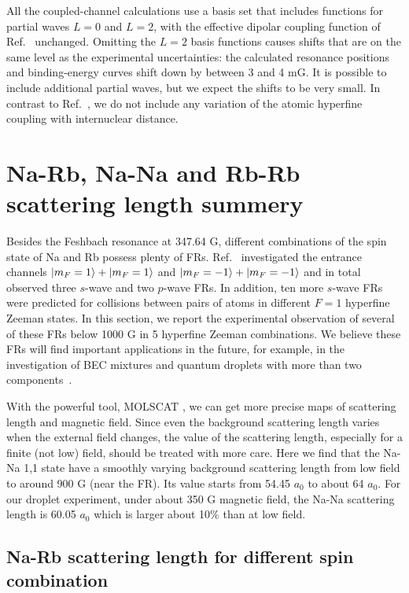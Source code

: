 All the coupled-channel calculations use a basis set that includes functions for partial waves $L = 0$ and $L =2$, with the effective dipolar coupling function of Ref.\ \cite{wang2013observation} unchanged. Omitting the $L = 2$ basis functions causes shifts that are on the same level as the experimental uncertainties: the calculated resonance positions and binding-energy curves shift down by between 3 and 4 mG. It is possible to include additional partial waves, but we expect the shifts to be very small. In contrast to Ref.\ \cite{wang2013observation}, we do not include any variation of the atomic hyperfine coupling with internuclear distance.


\section{Na-Rb, Na-Na and Rb-Rb scattering length summery}
\label{sec:FR_spec_more}
Besides the Feshbach resonance at 347.64 G, different combinations of the spin state of Na and Rb possess plenty of FRs. Ref.~\cite{wang2013observation} investigated the entrance channels $\ket{m_F=1}+\ket{m_F=1}$ and $\ket{m_F=-1}+\ket{m_F=-1}$ and in total observed three $s$-wave and two $p$-wave FRs. In addition, ten more $s$-wave FRs were predicted for collisions between pairs of atoms in different $F = 1$ hyperfine Zeeman states. In this section, we report the experimental observation of several of these FRs below 1000 G in 5 hyperfine Zeeman combinations. We believe these FRs will find important applications in the future, for example, in the investigation of BEC mixtures and quantum droplets with more than two components~\cite{ma2021}. 

With the powerful tool, MOLSCAT \cite{molscat:2019,mbf-github:2020}, we can get more precise maps of scattering length and magnetic field. Since even the background scattering length varies when the external field changes, the value of the scattering length, especially for a finite (not low) field, should be treated with more care. Here we find that the Na-Na 1,1 state have a smoothly varying background scattering length from low field to around 900 G (near the FR). Its value starts from 54.45 $a_0$ to about 64 $a_0$. For our droplet experiment, under about 350 G magnetic field, the Na-Na scattering length is 60.05 $a_0$ which is larger about 10\% than at low field.

\subsection{Na-Rb scattering length for different spin combination}

